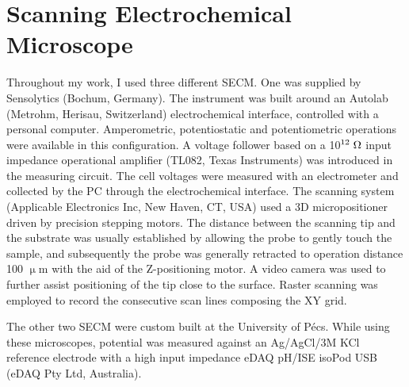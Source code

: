 	\section{Scanning Electrochemical Microscope}
Throughout my work, I used three different SECM.
One was supplied by Sensolytics (Bochum, Germany).
The instrument was built around an Autolab (Metrohm, Herisau, Switzerland) electrochemical interface, controlled with a personal computer.
Amperometric, potentiostatic and potentiometric operations were available in this configuration.
A voltage follower based on a 10$^{12}\; \ohm$ input impedance operational amplifier (TL082, Texas Instruments) was introduced in the measuring circuit.
The cell voltages were measured with an electrometer and collected by the PC through the electrochemical interface.
The scanning system (Applicable Electronics Inc, New Haven, CT, USA) used a 3D micropositioner driven by precision stepping motors.
The distance between the scanning tip and the substrate was usually established by allowing the probe to gently touch the sample, and subsequently the probe was generally retracted to operation distance 100 $\upmu$m with the aid of the Z-positioning motor.
A video camera was used to further assist positioning of the tip close to the surface.
Raster scanning was employed to record the consecutive scan lines composing the XY grid.

The other two SECM were custom built at the University of Pécs.
While using these microscopes, potential was measured against an Ag/AgCl/3M KCl reference electrode with a high input impedance eDAQ pH/ISE isoPod USB (eDAQ Pty Ltd, Australia).

